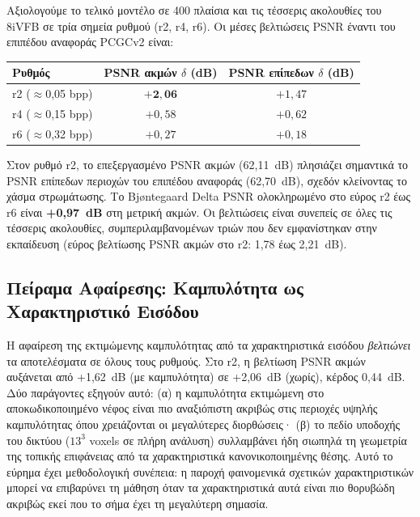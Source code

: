 Αξιολογούμε το τελικό μοντέλο σε 400 πλαίσια και τις τέσσερις ακολουθίες του 8iVFB
σε τρία σημεία ρυθμού (r2, r4, r6).
Οι μέσες βελτιώσεις PSNR έναντι του επιπέδου αναφοράς PCGCv2 είναι:

\begin{center}
\begin{tabular}{lcc}
  \toprule
  Ρυθμός & PSNR ακμών $\delta$ (dB) & PSNR επίπεδων $\delta$ (dB) \\
  \midrule
  r2 ($\approx$0,05 bpp) & $\mathbf{+2{,}06}$ & $+1{,}47$ \\
  r4 ($\approx$0,15 bpp) & $+0{,}58$ & $+0{,}62$ \\
  r6 ($\approx$0,32 bpp) & $+0{,}27$ & $+0{,}18$ \\
  \bottomrule
\end{tabular}
\end{center}

Στον ρυθμό r2, το επεξεργασμένο PSNR ακμών (62,11~dB) πλησιάζει σημαντικά το PSNR
επίπεδων περιοχών του επιπέδου αναφοράς (62,70~dB), σχεδόν κλείνοντας το χάσμα
στρωμάτωσης.
Το Bj{\o}ntegaard Delta PSNR ολοκληρωμένο στο εύρος r2 έως r6 είναι \textbf{+0,97~dB}
στη μετρική ακμών.
Οι βελτιώσεις είναι συνεπείς σε όλες τις τέσσερις ακολουθίες, συμπεριλαμβανομένων
τριών που δεν εμφανίστηκαν στην εκπαίδευση (εύρος βελτίωσης PSNR ακμών στο r2:
1,78 έως 2,21~dB).

\subsection{Πείραμα Αφαίρεσης: Καμπυλότητα ως Χαρακτηριστικό Εισόδου}

Η αφαίρεση της εκτιμώμενης καμπυλότητας από τα χαρακτηριστικά εισόδου
\emph{βελτιώνει} τα αποτελέσματα σε όλους τους ρυθμούς.
Στο r2, η βελτίωση PSNR ακμών αυξάνεται από +1,62~dB (με καμπυλότητα) σε
+2,06~dB (χωρίς), κέρδος 0,44~dB.
Δύο παράγοντες εξηγούν αυτό: (α) η καμπυλότητα εκτιμώμενη στο αποκωδικοποιημένο
νέφος είναι πιο αναξιόπιστη ακριβώς στις περιοχές υψηλής καμπυλότητας όπου
χρειάζονται οι μεγαλύτερες διορθώσεις· (β) το πεδίο υποδοχής του δικτύου
($13^3$ voxels σε πλήρη ανάλυση) συλλαμβάνει ήδη σιωπηλά τη γεωμετρία της
τοπικής επιφάνειας από τα χαρακτηριστικά κανονικοποιημένης θέσης.
Αυτό το εύρημα έχει μεθοδολογική συνέπεια: η παροχή φαινομενικά σχετικών
χαρακτηριστικών μπορεί να επιβαρύνει τη μάθηση όταν τα χαρακτηριστικά αυτά
είναι πιο θορυβώδη ακριβώς εκεί που το σήμα έχει τη μεγαλύτερη σημασία.

